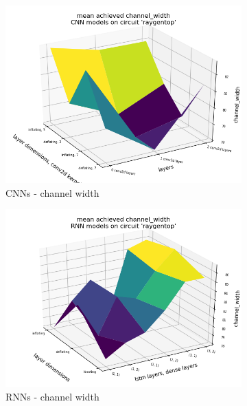 \begin{figure}
	\begin{subfigure}[b]{0.45\linewidth}
		\includegraphics[width=\linewidth]{plots/cnn-hyperopt-chan-width.png}
		\caption{\glspl{CNN} - channel width}
	\end{subfigure}
	\begin{subfigure}[b]{0.45\linewidth}
		\includegraphics[width=\linewidth]{plots/rnn-hyperopt-chan-width.png}
		\caption{\glspl{RNN} - channel width}
	\end{subfigure}
	\begin{subfigure}[b]{0.45\linewidth}

\end{subfigure}
\end{figure}
